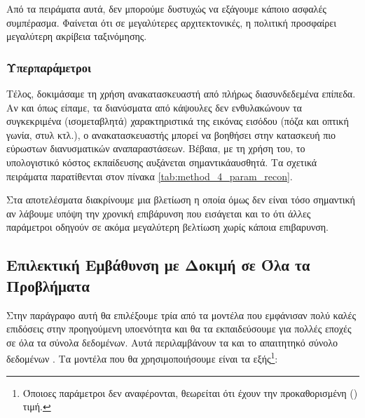 Από τα πειράματα αυτά, δεν μπορούμε δυστυχώς να εξάγουμε κάποιο ασφαλές συμπέρασμα. Φαίνεται ότι σε μεγαλύτερες αρχιτεκτονικές, η πολιτική  προσφαίρει μεγαλύτερη ακρίβεια ταξινόμησης.

\subsubsection{Υπερπαράμετροι }
Τέλος, δοκιμάσαμε τη χρήση ανακατασκευαστή από πλήρως διασυνδεδεμένα επίπεδα. Αν και όπως είπαμε, τα διανύσματα από κάψουλες δεν ενθυλακώνουν τα συγκεκριμένα (ισομεταβλητά) χαρακτηριστικά της εικόνας εισόδου (πόζα και οπτική γωνία, στυλ κτλ.), ο ανακατασκευαστής μπορεί να βοηθήσει στην κατασκευή πιο εύρωστων διανυσματικών αναπαραστάσεων. Βέβαια, με τη χρήση του, το υπολογιστικό κόστος εκπαίδευσης αυξάνεται σημαντικάαυσθητά. Τα σχετικά πειράματα παρατίθενται στον πίνακα \ref{tab:method_4_param_recon}.


\begin{table}[h]
    \begin{center}
    \end{center}
    \caption[]{\label{tab:method_4_param_recon}Επίδραση της παραμέτρου  της μεθόδου 4 στην επίδοση στο σύνολο δεδομένων ελέγχου . Τα πειράματα αυτά πραγματοποιήθηκαν για 10 εποχές με μέγεθος δέσμης ίσο με 8.} 
\end{table}

Στα αποτελέσματα διακρίνουμε μια βλετίωση η οποία όμως δεν είναι τόσο σημαντική αν λάβουμε υπόψη την χρονική επιβάρυνση που εισάγεται και το ότι άλλες παράμετροι οδηγούν σε ακόμα μεγαλύτερη βελτίωση χωρίς κάποια επιβαρυνση.

\subsection{Επιλεκτική Εμβάθυνση με Δοκιμή σε Όλα τα Προβλήματα}
Στην παράγραφο αυτή θα επιλέξουμε τρία από τα μοντέλα που εμφάνισαν πολύ καλές επιδόσεις στην προηγούμενη υποενότητα και θα τα εκπαιδεύσουμε για πολλές εποχές σε όλα τα σύνολα δεδομένων. Αυτά περιλαμβάνουν τα  και το απαιτητηκό σύνολο δεδομένων . Τα μοντέλα που θα χρησιμοποιήσουμε είναι τα εξής\footnote{Όποιοες παράμετροι δεν αναφέρονται, θεωρείται ότι έχουν την προκαθορισμένη () τιμή.}:

